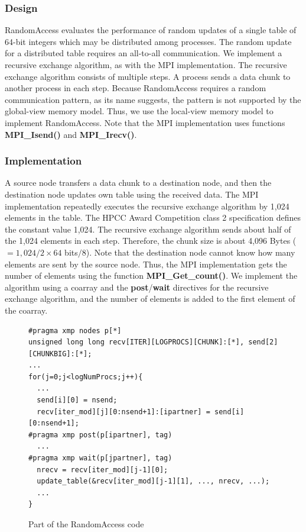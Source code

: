 \documentclass[graybox]{svmult}
\begin{document}
\subsubsection{Design}
RandomAccess evaluates the performance of random updates of a single table of 64-bit integers which may be distributed among processes.
The random update for a distributed table requires an all-to-all communication.
We implement a recursive exchange algorithm\cite{randomaccess}, as with the MPI implementation.
The recursive exchange algorithm consists of multiple steps.
A process sends a data chunk to another process in each step.
Because RandomAccess requires a random communication pattern, as its name suggests,
the pattern is not supported by the global-view memory model.
Thus, we use the local-view memory model to implement RandomAccess.
Note that the MPI implementation uses functions {\bf MPI\_Isend()} and {\bf MPI\_Irecv()}.

\subsubsection{Implementation}\label{sec:randomaccess}
A source node transfers a data chunk to a destination node,
and then the destination node updates own table using the received data.
The MPI implementation repeatedly executes the recursive exchange algorithm by 1,024 elements in the table.
The HPCC Award Competition class 2 specification defines the constant value 1,024.
The recursive exchange algorithm sends about half of the 1,024 elements in each step.
Therefore, the chunk size is about 4,096 Bytes ($= 1,024 / 2 \times 64 $ bits$ / 8 $).
Note that the destination node cannot know how many elements are sent by the source node.
Thus, the MPI implementation gets the number of elements using the function {\bf MPI\_Get\_count()}.
We implement the algorithm using a coarray and the {\bf post}/{\bf wait} directives for the recursive exchange algorithm,
and the number of elements is added to the first element of the coarray.

\begin{figure}[h]
\begin{lstlisting}
#pragma xmp nodes p[*]
unsigned long long recv[ITER][LOGPROCS][CHUNK]:[*], send[2][CHUNKBIG]:[*];
...
for(j=0;j<logNumProcs;j++){
  ...
  send[i][0] = nsend;
  recv[iter_mod][j][0:nsend+1]:[ipartner] = send[i][0:nsend+1];
#pragma xmp post(p[ipartner], tag)
  ...
#pragma xmp wait(p[jpartner], tag)
  nrecv = recv[iter_mod][j-1][0];
  update_table(&recv[iter_mod][j-1][1], ..., nrecv, ...);
  ...
}
\end{lstlisting}
\caption{Part of the RandomAccess code\cite{hpca}}\label{fig:code-ra}
\end{figure}
\end{document}
